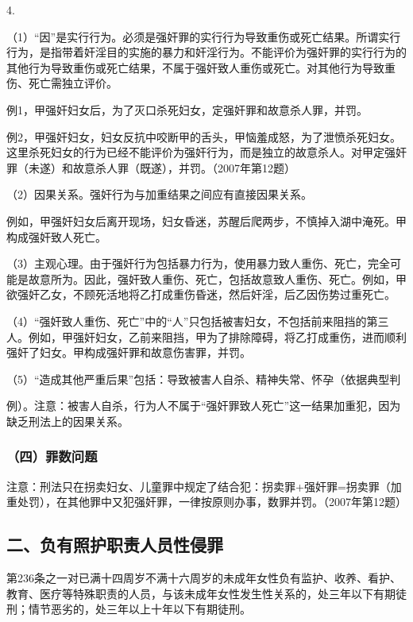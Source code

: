 4.

（1）“因”是实行行为。必须是强奸罪的实行行为导致重伤或死亡结果。所谓实行行为，是指带着奸淫目的实施的暴力和奸淫行为。不能评价为强奸罪的实行行为的其他行为导致重伤或死亡结果，不属于强奸致人重伤或死亡。对其他行为导致重伤、死亡需独立评价。

例1，甲强奸妇女后，为了灭口杀死妇女，定强奸罪和故意杀人罪，并罚。

例2，甲强奸妇女，妇女反抗中咬断甲的舌头，甲恼羞成怒，为了泄愤杀死妇女。这里杀死妇女的行为已经不能评价为强奸行为，而是独立的故意杀人。对甲定强奸罪（未遂）和故意杀人罪（既遂），并罚。（2007年第12题）

（2）因果关系。强奸行为与加重结果之间应有直接因果关系。

例如，甲强奸妇女后离开现场，妇女昏迷，苏醒后爬两步，不慎掉入湖中淹死。甲构成强奸致人死亡。

（3）主观心理。由于强奸行为包括暴力行为，使用暴力致人重伤、死亡，完全可能是故意所为。因此，强奸致人重伤、死亡，包括故意致人重伤、死亡。例如，甲欲强奸乙女，不顾死活地将乙打成重伤昏迷，然后奸淫，后乙因伤势过重死亡。

（4）“强奸致人重伤、死亡”中的“人”只包括被害妇女，不包括前来阻挡的第三人。例如，甲强奸妇女，乙前来阻挡，甲为了排除障碍，将乙打成重伤，进而顺利强奸了妇女。甲构成强奸罪和故意伤害罪，并罚。

（5）“造成其他严重后果”包括：导致被害人自杀、精神失常、怀孕（依据典型判

例）。注意：被害人自杀，行为人不属于“强奸罪致人死亡”这一结果加重犯，因为缺乏刑法上的因果关系。

\subsubsection*{（四）罪数问题}

注意：刑法只在拐卖妇女、儿童罪中规定了结合犯：拐卖罪+强奸罪=拐卖罪（加重处罚），在其他罪中又犯强奸罪，一律按原则办事，数罪并罚。（2007年第12题）

\subsection*{二、负有照护职责人员性侵罪}

第236条之一对已满十四周岁不满十六周岁的未成年女性负有监护、收养、看护、教育、医疗等特殊职责的人员，与该未成年女性发生性关系的，处三年以下有期徒刑；情节恶劣的，处三年以上十年以下有期徒刑。

